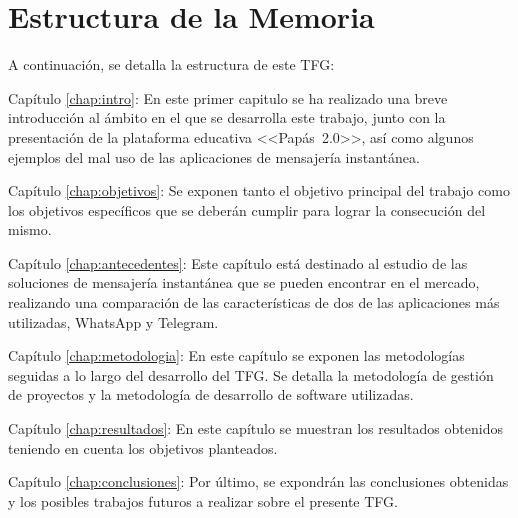 \section{Estructura de la Memoria}
A continuación, se detalla la estructura de este \acs{TFG}:

\begin{definitionlist}	
	\item[Capítulo \ref{chap:intro}: \nameref{chap:intro}]
	En este primer capitulo se ha realizado una breve introducción al ámbito en el que se desarrolla este trabajo, junto con la presentación de la plataforma educativa \mbox{<<Papás 2.0>>}, así como algunos ejemplos del mal uso de las aplicaciones de mensajería instantánea.
	
	\item[Capítulo \ref{chap:objetivos}: \nameref{chap:objetivos}]
	Se exponen tanto el objetivo principal del trabajo como los objetivos específicos que se deberán cumplir para lograr la consecución del mismo.
	
	\item[Capítulo \ref{chap:antecedentes}: \nameref{chap:antecedentes}]
	Este capítulo está destinado al estudio de las soluciones de mensajería instantánea que se pueden encontrar en el mercado, realizando una comparación de las características de dos de las aplicaciones más utilizadas, WhatsApp y Telegram.
	
	\item[Capítulo \ref{chap:metodologia}: \nameref{chap:metodologia}]
	En este capítulo se exponen las metodologías seguidas a lo largo del desarrollo del \acs{TFG}. Se detalla la metodología de gestión de proyectos y la metodología de desarrollo de software utilizadas.
	
	\item[Capítulo \ref{chap:resultados}: \nameref{chap:resultados}]
	En este capítulo se muestran los resultados obtenidos teniendo en cuenta los objetivos planteados.
	
	\item[Capítulo \ref{chap:conclusiones}: \nameref{chap:conclusiones}]
	Por último, se expondrán las conclusiones obtenidas y los posibles trabajos futuros a realizar sobre el presente \acs{TFG}.
\end{definitionlist}

